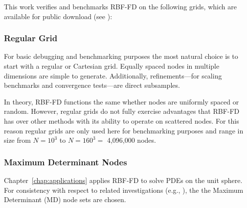 \documentclass[11pt]{report}
\begin{document}
{%


This work verifies and benchmarks RBF-FD on the following grids, which are available for public download (see \cite{BolligSphereGrids}):


\subsubsection{Regular Grid}
For basic debugging and benchmarking purposes the most natural choice is to start with a regular or Cartesian grid. Equally spaced nodes in multiple dimensions are simple to generate. Additionally, refinements---for scaling benchmarks and convergence tests---are direct subsamples. 

In theory, RBF-FD functions the same whether nodes are uniformly spaced or random. However, regular grids do not fully exercise advantages that RBF-FD has over other methods with its ability to operate on scattered nodes. For this reason regular grids are only used here for benchmarking purposes and range in size from $N=10^3$ to $N=160^3 =$ 4,096,000 nodes. 



\subsubsection{Maximum Determinant Nodes}

Chapter~\ref{chap:applications} applies RBF-FD to solve PDEs on the unit sphere. For consistency with respect to related investigations (e.g., \cite{Fornberg2009a, Fornberg2007,FornbergLehto11}), the the Maximum Determinant (MD) node sets \cite{Womersley2001, Sloan2003} are chosen. 

}
\end{document}
